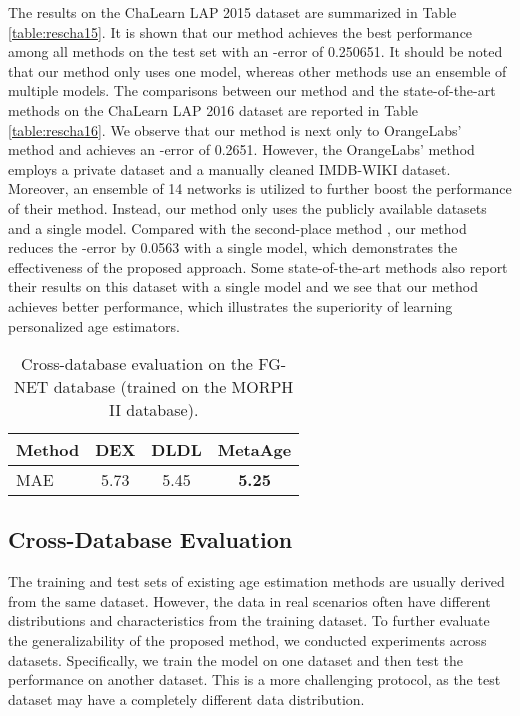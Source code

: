 \documentclass[journal,twoside]{IEEEtran}
\begin{document}
The results on the ChaLearn LAP 2015 dataset are summarized in Table \ref{table:rescha15}. It is shown that our method achieves the best performance among all methods on the test set with an -error of 0.250651. It should be noted that our method only uses one model, whereas other methods use an ensemble of multiple models. The comparisons between our method and the state-of-the-art methods on the ChaLearn LAP 2016 dataset are reported in Table \ref{table:rescha16}. We observe that our method is next only to OrangeLabs' method \cite{antipov2016apparent} and achieves an -error of 0.2651. However, the OrangeLabs' method employs a private dataset and a manually cleaned IMDB-WIKI dataset. Moreover, an ensemble of 14 networks is utilized to further boost the performance of their method. Instead, our method only uses the publicly available datasets and a single model. Compared with the second-place method \cite{huo2016deep}, our method reduces the -error by 0.0563 with a single model, which demonstrates the effectiveness of the proposed approach. Some state-of-the-art methods also report their results on this dataset with a single model and we see that our method achieves better performance, which illustrates the superiority of learning personalized age estimators.

\begin{table}[t]
  \caption{Cross-database evaluation on the FG-NET database (trained on the MORPH II database).}
  \label{table:crossdata}
  \renewcommand\tabcolsep{15pt}
  \centering
  \begin{tabular}{lccc}
  \toprule
  Method & DEX \cite{rothe2018deep} & DLDL \cite{gao2017deep} & MetaAge   \\
  \midrule
  MAE & 5.73 & 5.45 &  \textbf{5.25} \\
  \bottomrule
  \end{tabular}
\end{table}


\subsection{Cross-Database Evaluation}
The training and test sets of existing age estimation methods are usually derived from the same dataset.  However, the data in real scenarios often have different distributions and characteristics from the training dataset. To further evaluate the generalizability of the proposed method, we conducted experiments across datasets. Specifically, we train the model on one dataset and then test the performance on another dataset. This is a more challenging protocol, as the test dataset may have a completely different data distribution.
\end{document}
